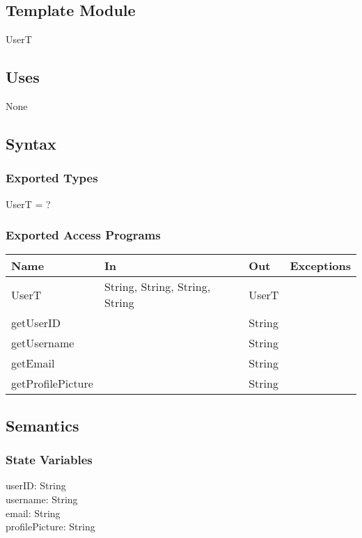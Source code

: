 \documentclass[12pt, titlepage]{article}
\begin{document}
\subsection{Template Module}
UserT
\subsection{Uses}

None

\subsection{Syntax}

\subsubsection{Exported Types}

UserT = ?

\subsubsection{Exported Access Programs}
\begin{center}
\begin{tabular}{ |  p{4cm} | p{3cm} |  p{3cm} | p{5cm} | }
\hline
\textbf{Name} & \textbf{In} & \textbf{Out} & \textbf{Exceptions} \\
\hline
UserT & String, String, String, String  & UserT & \\
getUserID & & String & \\
getUsername & & String & \\
getEmail & & String & \\
getProfilePicture & & String & \\

\hline
\end{tabular}
\end{center}

\subsection{Semantics}

\subsubsection{State Variables}

userID: String \\
username: String\\
email: String\\
profilePicture: String\\
\end{document}
